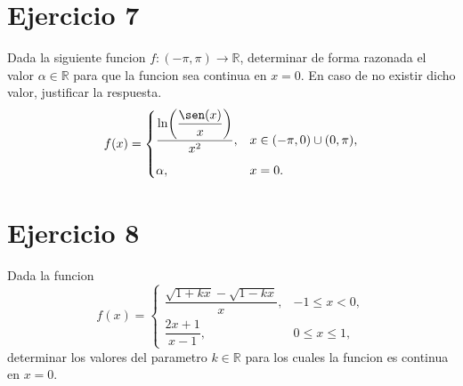 \documentclass[12pt]{article}
\begin{document}
\section*{Ejercicio 7}
Dada la siguiente funcion $f:(-\pi,\pi)\to \mathbb{R}$, determinar de forma razonada el valor $\alpha\in\mathbb{R}$ para que la funcion sea continua en $x=0$. En caso de no existir dicho valor, justificar la respuesta.
\[
f(x)=
\begin{cases}
\dfrac{\ln\!\left(\dfrac{\sen(x)}{x}\right)}{x^2}, & x\in(-\pi,0)\cup(0,\pi),\\[10pt]
\alpha, & x=0.
\end{cases}
\]
\section*{Ejercicio 8}
Dada la funcion
\[
f(x)=
\begin{cases}
\dfrac{\sqrt{1+kx}-\sqrt{1-kx}}{x}, & -1\le x<0,\\[10pt]
\dfrac{2x+1}{x-1}, & 0\le x\le 1,
\end{cases}
\]
determinar los valores del parametro $k\in\mathbb{R}$ para los cuales la funcion es continua en $x=0$.
\end{document}
